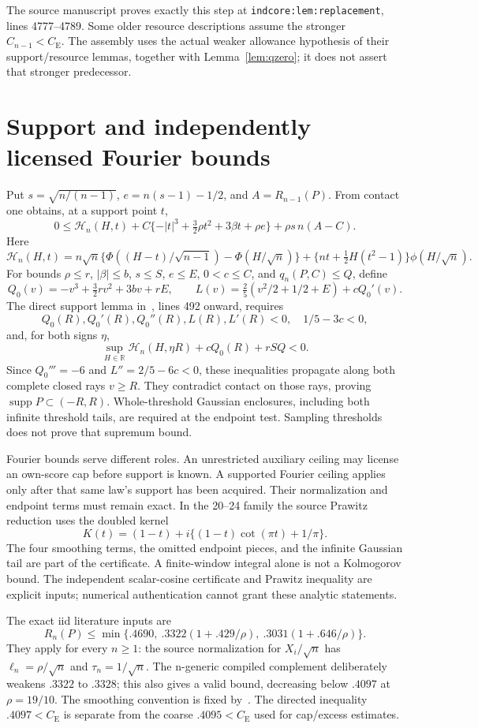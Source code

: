 \documentclass[11pt,a4paper]{article}
\newcommand{\R}{\mathbb R}
\newcommand{\CE}{C_{\mathrm E}}
\newcommand{\supp}{\operatorname{supp}}
\begin{document}
The source manuscript proves exactly this step at
\texttt{indcore:lem:replacement}, lines 4777--4789. Some older resource
descriptions assume the stronger \(C_{n-1}<\CE\). The assembly uses the
actual weaker allowance hypothesis of their support/resource lemmas, together
with Lemma~\ref{lem:qzero}; it does not assert that stronger predecessor.

\section{Support and independently licensed Fourier bounds}
Put \(s=\sqrt{n/(n-1)}\), \(e=n(s-1)-1/2\), and
\(A=R_{n-1}(P)\). From contact one obtains, at a support point \(t\),
\[
 0\le\mathcal H_n(H,t)
   +C\{-|t|^3+\tfrac32\rho t^2+3\beta t+\rho e\}
   +\rho s\,n(A-C).
\]
Here
\[
 \mathcal H_n(H,t)=n\sqrt n\{
 \Phi((H-t)/\sqrt{n-1})-\Phi(H/\sqrt n)\}
 +\{nt+\tfrac12H(t^2-1)\}\phi(H/\sqrt n).
\]
For bounds \(\rho\le r\), \(|\beta|\le b\), \(s\le S\), \(e\le E\),
\(0<c\le C\), and \(q_n(P,C)\le Q\), define
\[
 Q_0(v)=-v^3+\tfrac32rv^2+3bv+rE,\qquad
 L(v)=\tfrac25(v^2/2+1/2+E)+cQ_0'(v).
\]
The direct support lemma in~\cite{source}, lines 492 onward, requires
\[
 Q_0(R),Q_0'(R),Q_0''(R),L(R),L'(R)<0,\quad 1/5-3c<0,
\]
and, for both signs \(\eta\),
\[
 \sup_{H\in\R}\mathcal H_n(H,\eta R)+cQ_0(R)+rSQ<0.
\]
Since \(Q_0'''=-6\) and \(L''=2/5-6c<0\), these inequalities propagate
along both complete closed rays \(v\ge R\). They contradict contact on
those rays, proving \(\supp P\subset(-R,R)\). Whole-threshold Gaussian
enclosures, including both infinite threshold tails, are required at the
endpoint test. Sampling thresholds does not prove that supremum bound.

Fourier bounds serve different roles. An unrestricted auxiliary ceiling
may license an own-score cap before support is known. A supported Fourier
ceiling applies only after that same law's support has been acquired.
Their normalization and endpoint terms must remain exact. In the
20--24 family the source Prawitz reduction uses the doubled kernel
\[
 K(t)=(1-t)+i\{(1-t)\cot(\pi t)+1/\pi\}.
\]
The four smoothing terms, the omitted endpoint pieces, and the infinite
Gaussian tail are part of the certificate. A finite-window integral alone
is not a Kolmogorov bound. The independent scalar-cosine certificate and
Prawitz inequality are explicit inputs; numerical authentication cannot
grant these analytic statements.

The exact iid literature inputs are~\cite{shevtsova2013}
\[
 R_n(P)\le\min\{.4690,\ .3322(1+.429/\rho),\ .3031(1+.646/\rho)\}.
\]
They apply for every $n\ge1$: the source normalization for $X_i/\sqrt n$
has $\ell_n=\rho/\sqrt n$ and $\tau_n=1/\sqrt n$.
The n-generic compiled complement deliberately weakens $.3322$ to $.3328$;
this also gives a valid bound, decreasing below $.4097$ at $\rho=19/10$.
The smoothing convention is fixed by~\cite[Lemma~4.1, printed p.~263]{shevtsova2012}.
The directed inequality $.4097<\CE$ is separate from the coarse
$.4095<\CE$ used for cap/excess estimates.
\end{document}
